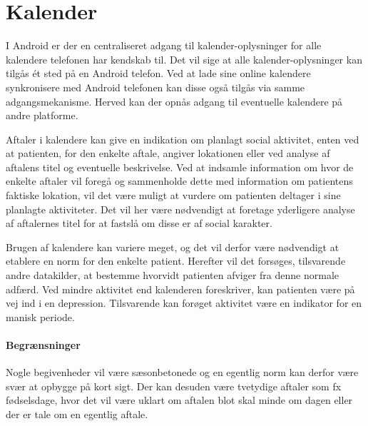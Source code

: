 \section{Kalender}
I Android er der en centraliseret adgang til kalender-oplysninger for alle kalendere telefonen har kendskab til.
Det vil sige at alle kalender-oplysninger kan tilgås \'et sted på en Android telefon.
Ved at lade sine online kalendere synkronisere med Android telefonen kan disse også tilgås via samme adgangsmekanisme.
Herved kan der opnås adgang til eventuelle kalendere på andre platforme.

Aftaler i kalendere kan give en indikation om planlagt social aktivitet, enten ved at patienten, for den enkelte aftale, angiver lokationen eller ved analyse af aftalens titel og eventuelle beskrivelse.
Ved at indsamle information om hvor de enkelte aftaler vil foregå og sammenholde dette med information om patientens faktiske lokation, vil det være muligt at vurdere om patienten deltager i sine planlagte aktiviteter.
Det vil her være nødvendigt at foretage yderligere analyse af aftalernes titel for at fastslå om disse er af social karakter.

Brugen af kalendere kan variere meget, og det vil derfor være nødvendigt at etablere en norm for den enkelte patient.
Herefter vil det forsøges, tilsvarende andre datakilder, at bestemme hvorvidt patienten afviger fra denne normale adfærd.
Ved mindre aktivitet end kalenderen foreskriver, kan patienten være på vej ind i en depression.
Tilsvarende kan forøget aktivitet være en indikator for en manisk periode.

\paragraph{Begrænsninger}
Nogle begivenheder vil være sæsonbetonede og en egentlig norm kan derfor være svær at opbygge på kort sigt.
Der kan desuden være tvetydige aftaler som fx fødselsdage, hvor det vil være uklart om aftalen blot skal minde om dagen eller der er tale om en egentlig aftale.